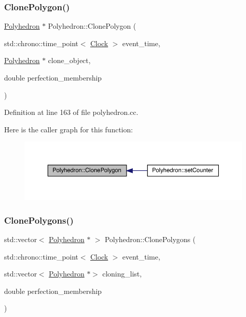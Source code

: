 \subsubsection{\texorpdfstring{Clone\+Polygon()}{ClonePolygon()}}
{\footnotesize\ttfamily \hyperlink{class_polyhedron}{Polyhedron} $\ast$ Polyhedron\+::\+Clone\+Polygon (\begin{DoxyParamCaption}\item[{std\+::chrono\+::time\+\_\+point$<$ \hyperlink{universe_8h_a0ef8d951d1ca5ab3cfaf7ab4c7a6fd80}{Clock} $>$}]{event\+\_\+time,  }\item[{\hyperlink{class_polyhedron}{Polyhedron} $\ast$}]{clone\+\_\+object,  }\item[{double}]{perfection\+\_\+membership }\end{DoxyParamCaption})}



Definition at line 163 of file polyhedron.\+cc.

Here is the caller graph for this function\+:
\nopagebreak
\begin{figure}[H]
\begin{center}
\leavevmode
\includegraphics[width=350pt]{class_polyhedron_abfacad3a348785dab8819e70bf92d8d1_icgraph}
\end{center}
\end{figure}
\mbox{\label{class_polyhedron_ab4f57da9595dc92de7340cc46237a2ea}} 
\subsubsection{\texorpdfstring{Clone\+Polygons()}{ClonePolygons()}}
{\footnotesize\ttfamily std\+::vector$<$ \hyperlink{class_polyhedron}{Polyhedron} $\ast$ $>$ Polyhedron\+::\+Clone\+Polygons (\begin{DoxyParamCaption}\item[{std\+::chrono\+::time\+\_\+point$<$ \hyperlink{universe_8h_a0ef8d951d1ca5ab3cfaf7ab4c7a6fd80}{Clock} $>$}]{event\+\_\+time,  }\item[{std\+::vector$<$ \hyperlink{class_polyhedron}{Polyhedron} $\ast$$>$}]{cloning\+\_\+list,  }\item[{double}]{perfection\+\_\+membership }\end{DoxyParamCaption})}



